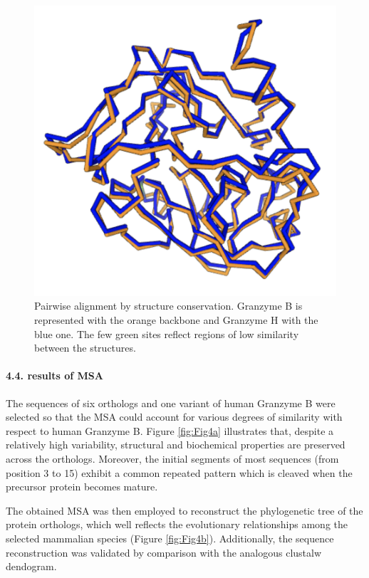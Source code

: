 \documentclass[
]{article}
\begin{document}
\begin{figure}

{\centering \includegraphics[width=0.6\linewidth]{secondary structure alignment/structure_conservation} 

}

\caption{Pairwise alignment by structure conservation. Granzyme B is represented with the orange backbone and Granzyme H with the blue one. The few green sites reflect regions of low similarity between the structures.}\label{fig:Fig3c}
\end{figure}

\hypertarget{results-of-msa}{%
\paragraph{4.4. results of MSA}\label{results-of-msa}}

The sequences of six orthologs and one variant of human Granzyme B were selected so that the MSA could account for various degrees of similarity with respect to human Granzyme B. Figure \ref{fig:Fig4a} illustrates that, despite a relatively high variability, structural and biochemical properties are preserved across the orthologs. Moreover, the initial segments of most sequences (from position 3 to 15) exhibit a common repeated pattern which is cleaved when the precursor protein becomes mature.

The obtained MSA was then employed to reconstruct the phylogenetic tree of the protein orthologs, which well reflects the evolutionary relationships among the selected mammalian species (Figure \ref{fig:Fig4b}). Additionally, the sequence reconstruction was validated by comparison with the analogous clustalw dendogram.
\end{document}
